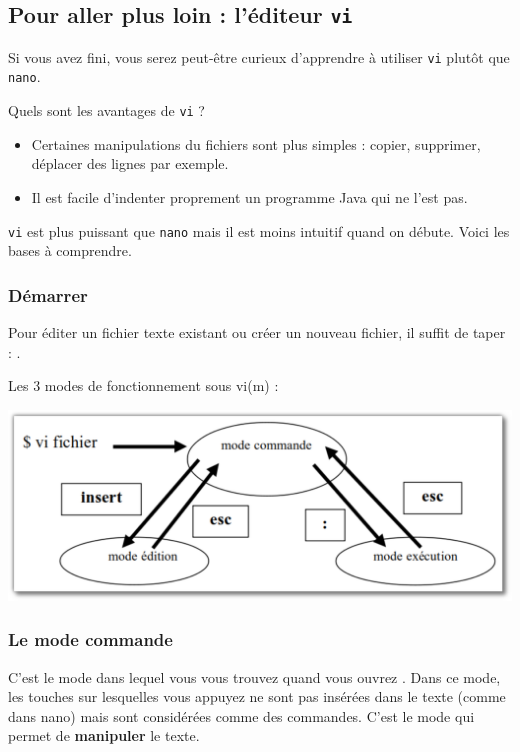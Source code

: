 \documentclass[a4paper,11pt]{style-esi/td}
\begin{document}
	\subsection{Pour aller plus loin : l'éditeur \texttt{vi}}

		Si vous avez fini,
		vous serez peut-être curieux d'apprendre à utiliser \texttt{vi}
		plutôt que \texttt{nano}.

		Quels sont les avantages de \texttt{vi} ?
		\begin{itemize}
		\item 
			Certaines manipulations du fichiers sont plus simples : 
			copier, supprimer, déplacer des lignes par exemple.
		\item 
			Il est facile d'indenter proprement un programme Java qui ne l'est pas.
		\end{itemize}

		\texttt{vi} est plus puissant que \texttt{nano}
		mais il est moins intuitif quand on débute.
		Voici les bases à comprendre.

		\subsubsection*{Démarrer}

			Pour éditer un fichier texte existant
			ou créer un nouveau fichier, 
			il suffit de taper : .

			Les 3 modes de fonctionnement sous vi(m) :
			\begin{center}
			\includegraphics[width=.7\textwidth]{image/vi.pdf}
			\end{center}

		\subsubsection*{Le mode commande}

			C'est le mode dans lequel vous vous trouvez quand vous ouvrez . 
			Dans ce mode, les touches sur lesquelles vous appuyez
			ne sont pas insérées dans le texte (comme dans nano)
			mais sont considérées comme des commandes.
			C'est le mode qui permet de \textbf{manipuler} le texte.
\end{document}
